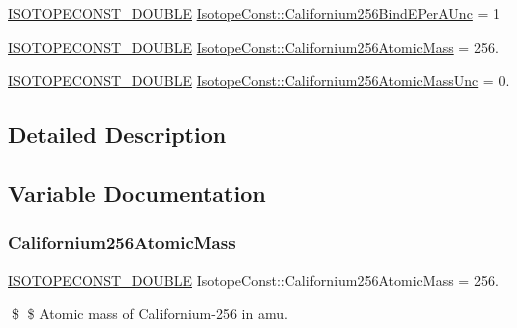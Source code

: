 \begin{DoxyCompactItemize}
\mbox{\hyperlink{group___isotope_const-_macros_ga8f45a7272ce02c0b4c65c44636ed719a}{I\+S\+O\+T\+O\+P\+E\+C\+O\+N\+S\+T\+\_\+\+D\+O\+U\+B\+LE}} \mbox{\hyperlink{group___isotope_const-_californium-_cf256_ga090514716fa1ba23efedab1d9b56c139}{Isotope\+Const\+::\+Californium256\+Bind\+E\+Per\+A\+Unc}} = 1
\item 
\mbox{\hyperlink{group___isotope_const-_macros_ga8f45a7272ce02c0b4c65c44636ed719a}{I\+S\+O\+T\+O\+P\+E\+C\+O\+N\+S\+T\+\_\+\+D\+O\+U\+B\+LE}} \mbox{\hyperlink{group___isotope_const-_californium-_cf256_ga5938557574e4a21b0a0261115a91d4f1}{Isotope\+Const\+::\+Californium256\+Atomic\+Mass}} = 256.
\item 
\mbox{\hyperlink{group___isotope_const-_macros_ga8f45a7272ce02c0b4c65c44636ed719a}{I\+S\+O\+T\+O\+P\+E\+C\+O\+N\+S\+T\+\_\+\+D\+O\+U\+B\+LE}} \mbox{\hyperlink{group___isotope_const-_californium-_cf256_ga692563619c99144148f138e366d48377}{Isotope\+Const\+::\+Californium256\+Atomic\+Mass\+Unc}} = 0.
\end{DoxyCompactItemize}


\subsection{Detailed Description}


\subsection{Variable Documentation}
\mbox{\label{group___isotope_const-_californium-_cf256_ga5938557574e4a21b0a0261115a91d4f1}} 
\subsubsection{\texorpdfstring{Californium256\+Atomic\+Mass}{Californium256AtomicMass}}
{\footnotesize\ttfamily \mbox{\hyperlink{group___isotope_const-_macros_ga8f45a7272ce02c0b4c65c44636ed719a}{I\+S\+O\+T\+O\+P\+E\+C\+O\+N\+S\+T\+\_\+\+D\+O\+U\+B\+LE}} Isotope\+Const\+::\+Californium256\+Atomic\+Mass = 256.}

\$ \$ Atomic mass of Californium-\/256 in amu. \mbox{\label{group___isotope_const-_californium-_cf256_ga692563619c99144148f138e366d48377}} 
